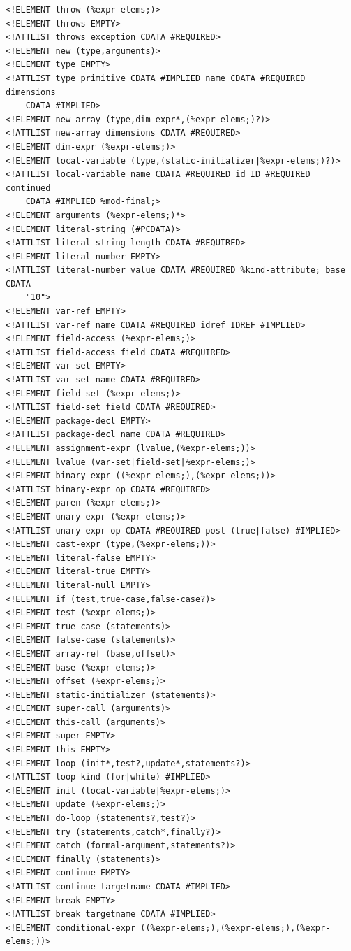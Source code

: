 \documentclass{article}
\begin{document}
{\begin{verbatim}
<!ELEMENT throw (%expr-elems;)>
<!ELEMENT throws EMPTY>
<!ATTLIST throws exception CDATA #REQUIRED>
<!ELEMENT new (type,arguments)>
<!ELEMENT type EMPTY>
<!ATTLIST type primitive CDATA #IMPLIED name CDATA #REQUIRED dimensions
    CDATA #IMPLIED>
<!ELEMENT new-array (type,dim-expr*,(%expr-elems;)?)>
<!ATTLIST new-array dimensions CDATA #REQUIRED>
<!ELEMENT dim-expr (%expr-elems;)>
<!ELEMENT local-variable (type,(static-initializer|%expr-elems;)?)>
<!ATTLIST local-variable name CDATA #REQUIRED id ID #REQUIRED continued
    CDATA #IMPLIED %mod-final;>
<!ELEMENT arguments (%expr-elems;)*>
<!ELEMENT literal-string (#PCDATA)>
<!ATTLIST literal-string length CDATA #REQUIRED>
<!ELEMENT literal-number EMPTY>
<!ATTLIST literal-number value CDATA #REQUIRED %kind-attribute; base CDATA
    "10">
<!ELEMENT var-ref EMPTY>
<!ATTLIST var-ref name CDATA #REQUIRED idref IDREF #IMPLIED>
<!ELEMENT field-access (%expr-elems;)>
<!ATTLIST field-access field CDATA #REQUIRED>
<!ELEMENT var-set EMPTY>
<!ATTLIST var-set name CDATA #REQUIRED>
<!ELEMENT field-set (%expr-elems;)>
<!ATTLIST field-set field CDATA #REQUIRED>
<!ELEMENT package-decl EMPTY>
<!ATTLIST package-decl name CDATA #REQUIRED>
<!ELEMENT assignment-expr (lvalue,(%expr-elems;))>
<!ELEMENT lvalue (var-set|field-set|%expr-elems;)>
<!ELEMENT binary-expr ((%expr-elems;),(%expr-elems;))>
<!ATTLIST binary-expr op CDATA #REQUIRED>
<!ELEMENT paren (%expr-elems;)>
<!ELEMENT unary-expr (%expr-elems;)>
<!ATTLIST unary-expr op CDATA #REQUIRED post (true|false) #IMPLIED>
<!ELEMENT cast-expr (type,(%expr-elems;))>
<!ELEMENT literal-false EMPTY>
<!ELEMENT literal-true EMPTY>
<!ELEMENT literal-null EMPTY>
<!ELEMENT if (test,true-case,false-case?)>
<!ELEMENT test (%expr-elems;)>
<!ELEMENT true-case (statements)>
<!ELEMENT false-case (statements)>
<!ELEMENT array-ref (base,offset)>
<!ELEMENT base (%expr-elems;)>
<!ELEMENT offset (%expr-elems;)>
<!ELEMENT static-initializer (statements)>
<!ELEMENT super-call (arguments)>
<!ELEMENT this-call (arguments)>
<!ELEMENT super EMPTY>
<!ELEMENT this EMPTY>
<!ELEMENT loop (init*,test?,update*,statements?)>
<!ATTLIST loop kind (for|while) #IMPLIED>
<!ELEMENT init (local-variable|%expr-elems;)>
<!ELEMENT update (%expr-elems;)>
<!ELEMENT do-loop (statements?,test?)>
<!ELEMENT try (statements,catch*,finally?)>
<!ELEMENT catch (formal-argument,statements?)>
<!ELEMENT finally (statements)>
<!ELEMENT continue EMPTY>
<!ATTLIST continue targetname CDATA #IMPLIED>
<!ELEMENT break EMPTY>
<!ATTLIST break targetname CDATA #IMPLIED>
<!ELEMENT conditional-expr ((%expr-elems;),(%expr-elems;),(%expr-elems;))>
\end{verbatim}
}
\end{document}
